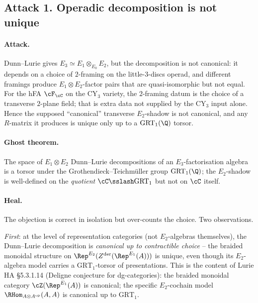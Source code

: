 \subsection*{Attack 1.  Operadic decomposition is not unique}

\paragraph{Attack.}  Dunn--Lurie gives $E_3 \simeq E_1 \otimes_{E_0}
E_2$, but the decomposition is not canonical: it depends on a choice of
$2$-framing on the little-$3$-discs operad, and different framings
produce $E_1 \otimes E_2$-factor pairs that are quasi-isomorphic but
not equal.  For the hFA $\cF_\cC$ on the CY$_3$ variety, the
$2$-framing datum is the choice of a transverse $2$-plane field; that
is extra data not supplied by the CY$_3$ input alone.  Hence the
supposed ``canonical'' transverse $E_2$-shadow is not canonical, and
any $R$-matrix it produces is unique only up to a $\mathrm{GRT}_1(\Q)$
torsor.

\paragraph{Ghost theorem.}  The space of $E_1 \otimes E_2$ Dunn--Lurie
decompositions of an $E_3$-factorisation algebra is a torsor under the
Grothendieck--Teichm\"uller group $\mathrm{GRT}_1(\Q)$; the
$E_2$-shadow is well-defined on the \emph{quotient} $\cC \sslash
\mathrm{GRT}_1$ but not on $\cC$ itself.

\paragraph{Heal.}  The objection is correct in isolation but
over-counts the choice.  Two observations.

\emph{First}: at the level of representation categories (not
$E_2$-algebras themselves), the Dunn--Lurie decomposition is
\emph{canonical up to contractible choice} -- the braided monoidal
structure on $\Rep^{E_2}(Z^{\mathrm{der}}(\Rep^{E_1}(A)))$ is unique,
even though its $E_2$-algebra model carries a $\mathrm{GRT}_1$-torsor
of presentations.  This is the content of Lurie HA \S5.3.1.14
(Deligne conjecture for dg-categories): the braided monoidal category
$\cZ(\Rep^{E_1}(A))$ is canonical; the specific $E_2$-cochain model
$\RHom_{A \otimes A^{\mathrm{op}}}(A, A)$ is canonical up to
$\mathrm{GRT}_1$.

